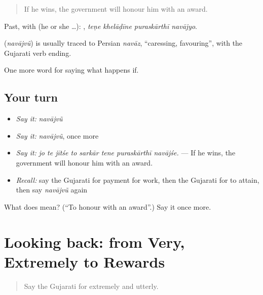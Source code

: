 \begin{quote}
If he wins, the government will honour him with an award.
\end{quote}

Past, with  (he or she …):    , \emph{teṇe khelāḍīne puraskārthī navājyo}.

\begin{cousinweb}
\textbf{} (\emph{navājvũ}) is usually traced to Persian \emph{navāz}, \textquotedblleft{}caressing, favouring\textquotedblright{}, with the Gujarati verb ending.
\end{cousinweb}

\begin{grammarlens}[title={What you've built}]
One more word for saying what happens if.
\end{grammarlens}

\subsection*{Your turn}
\begin{itemize}
\raggedright
  \item \emph{Say it:} \emph{navājvũ}
  \item \emph{Say it:} \emph{navājvũ}, once more
  \item \emph{Say it:} \emph{jo te jītśe to sarkār tene puraskārthī navājśe.} — If he wins, the government will honour him with an award.
  \item \emph{Recall:} say the Gujarati for payment for work, then the Gujarati for to attain, then say \emph{navājvũ} again
\end{itemize}

\begin{tcolorbox}[breakable,colback=teal!4,colframe=teal!35!black,title={Before you move on}]
What does  mean? (\textquotedblleft{}To honour with an award\textquotedblright{}.) Say it once more.
\end{tcolorbox}
\section[(dialogue)]{Looking back: from Very, Extremely to Rewards}

\label{lesson:GU-R385-review-379-385}



\begin{quote}
Say the Gujarati for extremely and utterly.
\end{quote}

